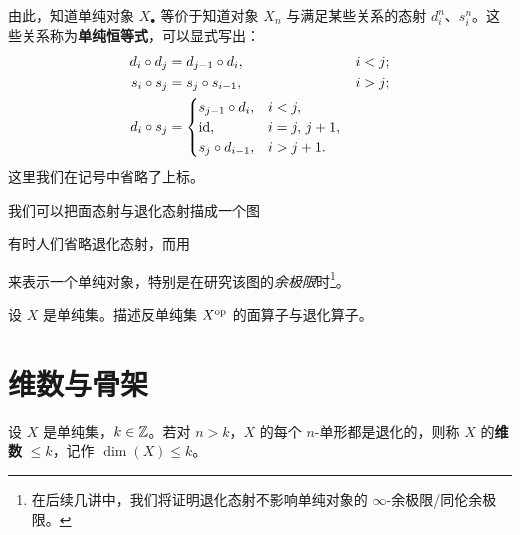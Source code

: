 \begin{remark}\label{L3-2.8}
由此，知道单纯对象 $X_{\bullet}$ 等价于知道对象 $X_{n}$ 与满足某些关系的态射 $d^{n}_{i}$、$s^{n}_{i}$。这些关系称为\textbf{单纯恒等式}，可以显式写出：
\[
\begin{aligned}
d_{i}\circ d_{j}&=d_{j-1}\circ d_{i}, && i<j;\\
s_{i}\circ s_{j}&=s_{j}\circ s_{i-1}, && i>j;\\
d_{i}\circ s_{j}&=
\begin{cases}
s_{j-1}\circ d_{i}, & i<j,\\
\operatorname{id}, & i=j,\,j+1,\\
s_{j}\circ d_{i-1}, & i>j+1.
\end{cases}
\end{aligned}
\]
这里我们在记号中省略了上标。
\end{remark}

\nitem\label{L3-2.9}
我们可以把面态射与退化态射描成一个图
\begin{center}
\end{center}
有时人们省略退化态射，而用
\begin{center}
\end{center}
来表示一个单纯对象，特别是在研究该图的\emph{余极限}时\footnote{在后续几讲中，我们将证明退化态射不影响单纯对象的 $\infty$-余极限/同伦余极限。}。

\begin{exercise}\label{L3-2.10}
设 $X$ 是单纯集。描述反单纯集 $X^{\mathrm{op}}$ 的面算子与退化算子。
\end{exercise}

\section{维数与骨架}

\begin{definition}\label{L3-3.1}
设 $X$ 是单纯集，$k\in\mathbb{Z}$。若对 $n>k$，$X$ 的每个 $n$-单形都是退化的，则称 $X$ 的\textbf{维数} $\le k$，记作 $\dim(X)\le k$。
\end{definition}


